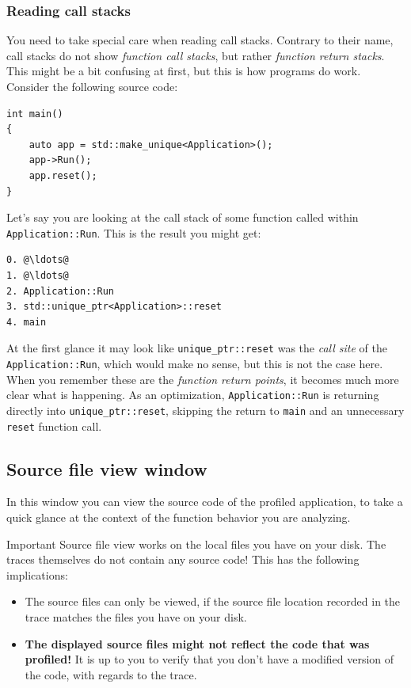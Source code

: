 \documentclass[hidelinks,titlepage,a4paper]{article}
\begin{document}
\subsubsection{Reading call stacks}

You need to take special care when reading call stacks. Contrary to their name, call stacks do not show \emph{function call stacks}, but rather \emph{function return stacks}. This might be a bit confusing at first, but this is how programs do work. Consider the following source code:

\begin{lstlisting}
int main()
{
    auto app = std::make_unique<Application>();
    app->Run();
    app.reset();
}
\end{lstlisting}

Let's say you are looking at the call stack of some function called within \texttt{Application::Run}. This is the result you might get:

\begin{lstlisting}
0. @\ldots@
1. @\ldots@
2. Application::Run
3. std::unique_ptr<Application>::reset
4. main
\end{lstlisting}

At the first glance it may look like \texttt{unique\_ptr::reset} was the \emph{call site} of the \texttt{Application::Run}, which would make no sense, but this is not the case here. When you remember these are the \emph{function return points}, it becomes much more clear what is happening. As an optimization, \texttt{Application::Run} is returning directly into \texttt{unique\_ptr::reset}, skipping the return to \texttt{main} and an unnecessary \texttt{reset} function call.

\subsection{Source file view window}
\label{sourceview}

In this window you can view the source code of the profiled application, to take a quick glance at the context of the function behavior you are analyzing.

\begin{bclogo}[
noborder=true,
couleur=black!5,
logo=\bcbombe
]{Important}
Source file view works on the local files you have on your disk. The traces themselves do not contain any source code! This has the following implications:

\begin{itemize}
\item The source files can only be viewed, if the source file location recorded in the trace matches the files you have on your disk.
\item \textbf{The displayed source files might not reflect the code that was profiled!} It is up to you to verify that you don't have a modified version of the code, with regards to the trace.
\end{itemize}
\end{bclogo}
\end{document}
